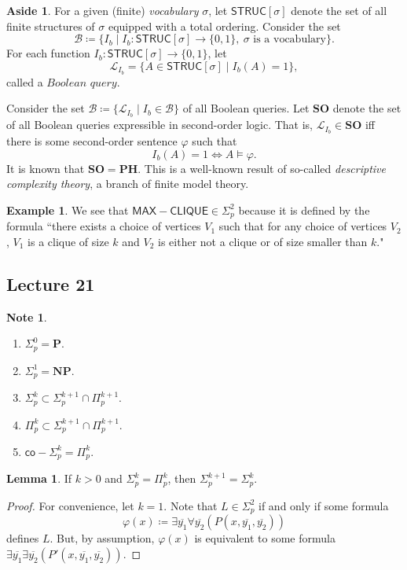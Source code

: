 \documentclass[10pt,letterpaper,cm]{nupset}
\theoremstyle{definition}
\newtheorem{exmp}{Example}
\newtheorem{note}{Note}
\newtheorem*{aside}{Aside}
\newtheorem{lemma}{Lemma}
\newcommand{\1}{\mathbf{1}}
\newcommand{\0}{\vec 0}
\begin{document}
\begin{aside}
For a given (finite) \textit{vocabulary} $\sigma$, let $\mathsf{STRUC}[\sigma]$ denote the set of all  finite structures of $\sigma$ equipped with a total ordering. Consider the set $$\mathcal{B} \coloneqq \{I_b \mid I_b :   \mathsf{STRUC}[\sigma] \to \{0,1\},\  \sigma \text{ is a vocabulary}\}.$$ For each  function $I_b :  \mathsf{STRUC}[\sigma] \to \{0,1\}$, let $$\mathcal{L}_{I_b} = \{A \in \mathsf{STRUC}[\sigma] \mid I_b(A) = 1\},$$ called a $\textit{Boolean query}$. 

Consider the set $\mathcal{B} \coloneqq \{ \mathcal{L}_{I_b} \mid I_b \in \mathcal{B}\}$ of all Boolean queries. Let $\mathbf{SO}$ denote the set of all Boolean queries expressible in second-order logic. That is, $\mathcal{L}_{I_b} \in \mathbf{SO}$ iff there is some second-order sentence $\varphi$ such that $$I_b(A) =1 \iff A \models \varphi.$$ It is known that $\mathbf{SO} = \mathbf{PH}$. This is a well-known result of so-called \textit{descriptive complexity theory}, a branch of finite model theory.
\end{aside}

\begin{exmp} 
We see that $\mathsf{MAX{-}CLIQUE} \in \Sigma^2_p$ because it is defined by the formula ``there exists a choice of vertices $V_1$ such that for any choice of vertices $V_2$, $V_1$ is a clique of size $k$ and $V_2$ is either not a clique or of size smaller than $k$."
\end{exmp}

\subsection{Lecture 21}

\begin{note} $ $
\begin{enumerate}
\item $\Sigma_p^0 = \mathbf{P}$.
\item $\Sigma_p^1 = \mathbf{NP} $.
\item $\Sigma^k_p \subset \Sigma^{k+1}_p \cap \Pi^{k+1}_p$.
\item $\Pi^k_p \subset \Sigma^{k+1}_p \cap \Pi^{k+1}_p$.
\item $\mathsf{co}{-}\Sigma^k_p = \Pi^k_p$. 
\end{enumerate}
\end{note}

\begin{lemma}
If $k>0$ and $\Sigma_p^k = \Pi^k_p$, then $\Sigma^{k+1}_p = \Sigma^k_p$.
\end{lemma}
\begin{proof}
For convenience, let $k=1$. Note that $L \in \Sigma^2_p$ if and only if some formula $$\varphi(x)\coloneqq \exists{\overline{y_1}}\forall{\overline{y_2}}(P(x, \overline{y_1}, \overline{y_2}))$$ defines $L$. But, by assumption, $\varphi(x)$ is equivalent to some formula  $ \exists{\overline{y_1}}\exists{\overline{y_2}}(P'(x, \overline{y_1}, \overline{y_2}))$.
\end{proof}
\end{document}
